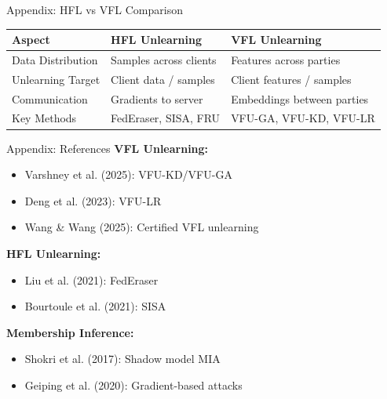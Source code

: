 \documentclass[aspectratio=169, 11pt]{beamer}
\begin{document}
\appendix

\begin{frame}{Appendix: HFL vs VFL Comparison}
    \begin{table}[]
        \centering
        \footnotesize
        \begin{tabular}{p{2.5cm}p{4.5cm}p{4.5cm}}
            \toprule
            \textbf{Aspect} & \textbf{HFL Unlearning} & \textbf{VFL Unlearning} \\
            \midrule
            Data Distribution & Samples across clients & Features across parties \\
            Unlearning Target & Client data / samples & Client features / samples \\
            Communication & Gradients to server & Embeddings between parties \\
            Key Methods & FedEraser, SISA, FRU & VFU-GA, VFU-KD, VFU-LR \\
            \bottomrule
        \end{tabular}
    \end{table}
\end{frame}

\begin{frame}{Appendix: References}
    \footnotesize
    \textbf{VFL Unlearning:}
    \begin{itemize}
        \item Varshney et al. (2025): VFU-KD/VFU-GA
        \item Deng et al. (2023): VFU-LR
        \item Wang \& Wang (2025): Certified VFL unlearning
    \end{itemize}
    
    \vspace{0.3em}
    \textbf{HFL Unlearning:}
    \begin{itemize}
        \item Liu et al. (2021): FedEraser
        \item Bourtoule et al. (2021): SISA
    \end{itemize}
    
    \vspace{0.3em}
    \textbf{Membership Inference:}
    \begin{itemize}
        \item Shokri et al. (2017): Shadow model MIA
        \item Geiping et al. (2020): Gradient-based attacks
    \end{itemize}
\end{frame}
\end{document}
